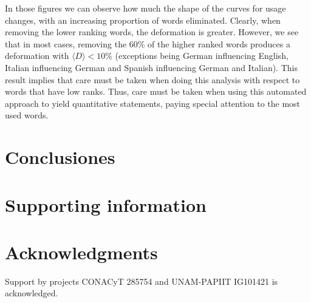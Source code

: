 \documentclass[10pt,letterpaper]{article} %
\begin{document}
In those figures we can observe how much the shape of the curves for usage changes, 
with an increasing proportion of words eliminated. Clearly, when removing the 
lower ranking words, the deformation is greater. However, we see that in 
most cases,  removing the 60\% of the higher ranked words produces
a deformation with $\langle D \rangle < 10\%$ (exceptions being 
German influencing English, Italian influencing German and
Spanish influencing German and Italian). 
% 
% 
% 
% 
This result implies that care must be taken when doing this analysis with respect to 
words that have low ranks. Thus, care must be taken when using this automated approach
to yield quantitative statements, paying special attention to the most used words. 



\section*{Conclusiones} %
\section*{Supporting information} %
\section*{Acknowledgments} %

\nolinenumbers

Support by projects CONACyT 285754 and UNAM-PAPIIT IG101421 is acknowledged. 
 
\end{document}
